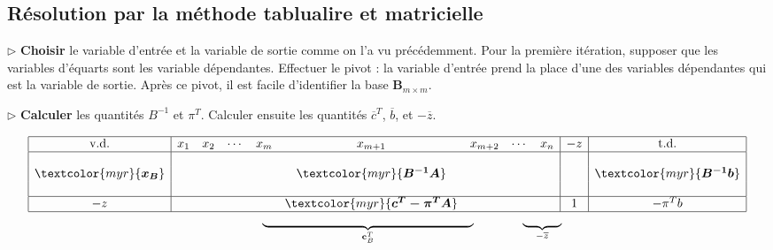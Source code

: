\documentclass{report}
\begin{document}
\begin{multicols*}{2}
\section{Résolution par la méthode tablualire et matricielle}
\noindent 
$\rhd$ \textbf{Choisir} le variable d'entrée et la variable de sortie comme on  
l'a vu précédemment. Pour la première itération, supposer que les variables 
d'équarts sont les variable dépendantes. Effectuer le pivot : la variable 
d'entrée prend la place d'une des variables dépendantes qui est la variable de 
sortie. Après ce pivot, il est facile d'identifier la base $\boldsymbol{B}_{m\times m}$.

\noindent
$\rhd$ \textbf{Calculer} les quantités $B^{-1}$ et $\pi^T$. Calculer ensuite 
les quantités $\overline{c}^T$, $\overline{b}$, et $-\overline{z}$.
\end{multicols*}

\[
\begin{array}{c c}
\begin{array}{|c|c c c c c c c c|c|c|}
\hline
\text{v.d.} & x_1 & x_2 & \cdots & x_m & x_{m+1} & x_{m+2} & \cdots & x_n & -z & \text{t.d.} \\
\hline
& &  & & & &  & & & & \\
\textcolor{myr}{\boldsymbol{x_B}} & & & & & \textcolor{myr}{\boldsymbol{B^{-1}A}}  & & & & & 
\textcolor{myr}{\boldsymbol{B^{-1}b}  } \\
& &  & & & &  & & & & \\
\hline
-z & &  & &   
   &\textcolor{myr}{\boldsymbol{c^T -\pi^TA}  } & & & & 1 & -\pi^Tb \\
\hline
\end{array}\\
\begin{array}{c c c c c c c c c }
    & & & & \underbrace{\hspace{6.cm}}_{\mathbf{c}_B^T} & & & & \underbrace{\hspace{1.1cm}}_{-\overline{z}} \\
\end{array}
\end{array}
\]
\end{document}
